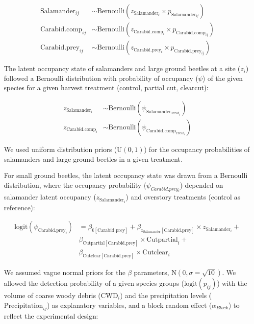 \begin{align}
  \text{Salamander}_{ij} &\sim \text{Bernoulli}(z_{\text{Salamander}_i} \times p_{\text{Salamander}_{ij}}) \nonumber \\
  \text{Carabid.comp}_{ij} &\sim \text{Bernoulli}(z_{\text{Carabid.comp}_i} \times p_{\text{Carabid.comp}_{ij}})  \\
  \text{Carabid.prey}_{ij} &\sim \text{Bernoulli}(z_{\text{Carabid.prey}_i} \times p_{\text{Carabid.prey}_{ij}}) \nonumber
\end{align}


The latent occupancy state of salamanders and large ground beetles at a site ($z_{i}$) followed a Bernoulli distribution 
with probability of occupancy ($\psi$) of the given species for a given harvest treatment (control, partial cut, clearcut):


\begin{align}
  z_{\text{Salamander}_i} &\sim \text{Bernoulli}(\psi_{\text{Salamander}_{\text{Treat}_i}}) \nonumber \\
  z_{\text{Carabid.comp}_i} &\sim \text{Bernoulli}(\psi_{\text{Carabid.comp}_{\text{Treat}_i}})
\end{align}


We used uniform distribution priors ($\text{U}(0, 1)$) for the occupancy probabilities of salamanders and large ground beetles in a given treatment. 

For small ground beetles, the latent occupancy state was drawn from a Bernoulli distribution, where the occupancy probability ($\psi_{Carabid.prey_{i}}$) 
depended on salamander latent occupancy ($z_{\text{Salamander}_i}$) and overstory treatments (control as reference):


\begin{align}
  \text{logit}(\psi_{\text{Carabid.prey}_i}) &= \beta_{0[\text{Carabid.prey}]} + \beta_{z_{\text{Salamander}}[\text{Carabid.prey}]} \times z_{\text{Salamander}_i} + \nonumber \\
  &\beta_{\text{Cutpartial}[\text{Carabid.prey}]} \times \text{Cutpartial}_i + \\
  &\beta_{\text{Cutclear}[\text{Carabid.prey}]} \times \text{Cutclear}_i \nonumber
\end{align}

We assumed vague normal priors for the $\beta$ parameters, $\text{N}(0, \sigma = \sqrt{10})$. 
We allowed the detection probability of a given species groups ($\text{logit}(p_{ij})$) with the volume of coarse woody debris ($\text{CWD}_i$) and the precipitation levels 
($\text{Precipitation}_{ij}$) as explanatory variables, and a block random effect ($\alpha_{Block}$) to reflect the experimental design:


